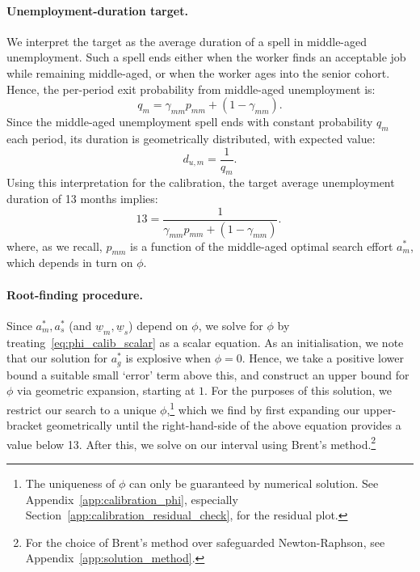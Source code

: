\documentclass{article}
\newcommand{\lbar}[1]{\underline{#1}} %
\begin{document}
\paragraph{Unemployment-duration target.} We interpret the target as the average duration of a spell in middle-aged unemployment. Such a spell ends either when the worker finds an acceptable job while remaining middle-aged, or when the worker ages into the senior cohort. Hence, the per-period exit probability from middle-aged unemployment is:
\[
q_m=\gamma_{mm}p_{mm}+(1-\gamma_{mm}).
\]
Since the middle-aged unemployment spell ends with constant probability $q_m$ each period, its duration is geometrically distributed, with expected value:
\[
d_{u,m}=\frac{1}{q_m}.
\]
Using this interpretation for the calibration, the target average unemployment duration of 13 months implies:
\begin{equation}
13
=
\frac{1}{\gamma_{mm}p_{mm}+(1-\gamma_{mm})}.
~\label{eq:phi_calib_scalar}
\end{equation}
where, as we recall, $p_{mm}$ is a function of the middle-aged optimal search effort $a^*_m$, which depends in turn on $\phi$.

\paragraph{Root-finding procedure.} Since $a_m^*, a^*_s$ (and $\lbar{w}_m,\lbar{w}_s$) depend on $\phi$, we solve for $\phi$ by treating~\eqref{eq:phi_calib_scalar} as a scalar equation. As an initialisation, we note that our solution for $a^*_g$ is explosive when $\phi=0$. Hence, we take a positive lower bound a suitable small `error' term above this, and construct an upper bound for $\phi$ via geometric expansion, starting at $1$. For the purposes of this solution, we restrict our search to a unique $\phi$,\footnote{The uniqueness of $\phi$ can only be guaranteed by numerical solution. See Appendix~\ref{app:calibration_phi}, especially Section~\ref{app:calibration_residual_check}, for the residual plot.} which we find by first expanding our upper-bracket geometrically until the right-hand-side of the above equation provides a value below 13. After this, we solve on our interval using Brent's method.\footnote{For the choice of Brent's method over safeguarded Newton-Raphson, see Appendix~\ref{app:solution_method}.}
\end{document}
